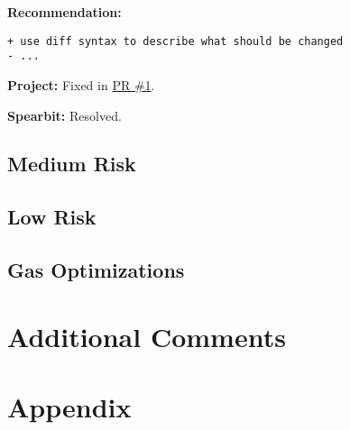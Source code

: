 \textbf{Recommendation:}

\begin{verbatim}
+ use diff syntax to describe what should be changed
- ...
\end{verbatim}

\textbf{Project:} Fixed in \href{Https://github.com/actuallink}{PR \#1}.

\textbf{Spearbit:} Resolved.

\subsection{Medium Risk}\label{medium-risk}

\subsection{Low Risk}\label{low-risk}

\subsection{Gas Optimizations}\label{gas-optimizations}

\section{Additional Comments}\label{additional-comments}

\section{Appendix}\label{appendix}
